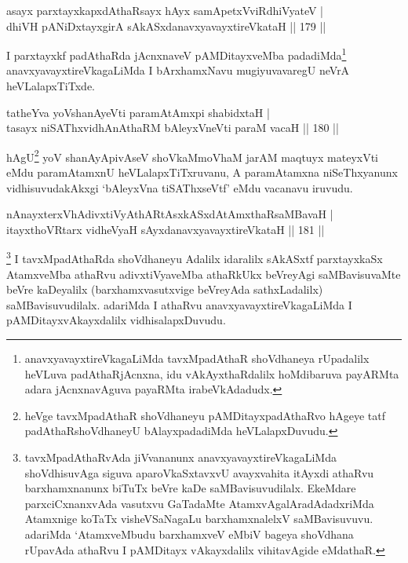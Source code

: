 
\begin{shl}
asayx parxtayxkapxdAthaRsayx hAyx samApetxVviRdhiVyateV |\\
dhiVH pANiDxtayxgirA sAkASxdanavxyavayxtireVkataH \hfill || 179 ||
\end{shl}

\begin{artha}
I parxtayxkf padAthaRda jAcnxnaveV pAMDitayxveMba padadiMda\footnote[1]{anavxyavayxtireVkagaLiMda tavxMpadAthaR shoVdhaneya rUpadalilx heVLuva padAthaRjAcnxna, idu vAkAyxthaRdalilx hoMdibaruva payARMta adara jAcnxnavAguva payaRMta irabeVkAdadudx.} anavxyavayxtireVkagaLiMda I bArxhamxNavu mugiyuvavaregU neVrA heVLalapxTiTxde.
\end{artha}


\begin{shl}
tatheYva yoV\s shanAyeVti paramAtAmx\s pi shabidxtaH |\\
tasayx niSAThxvidhAnAthaRM bAleyxVneVti paraM vacaH \hfill || 180 ||
\end{shl}

\begin{artha}
hAgU\footnote[2]{heVge tavxMpadAthaR shoVdhaneyu pAMDitayxpadAthaRvo hAgeye tatf padAthaRshoVdhaneyU bAlayxpadadiMda heVLalapxDuvudu.} yoV shanAyApivAseV shoVkaMmoVhaM jarAM maqtuyx mateyxVti eMdu paramAtamxnU heVLalapxTiTxruvanu, A paramAtamxna niSeThxyanunx vidhisuvudakAkxgi `bAleyxVna tiSAThxseVtf' eMdu vacanavu iruvudu.
\end{artha}

\begin{shl}
nAnayxterxVhAdivxtiVyAthARtAsxkASxdAtAmxthaRsaMBavaH |\\
itayxthoVR\s tarx vidheVyaH sAyxdanavxyavayxtireVkataH \hfill || 181 ||
\end{shl}

\begin{artha}%
\footnote[1]{tavxMpadAthaRvAda jiVvananunx anavxyavayxtireVkagaLiMda shoVdhisuvAga siguva aparoVkaSxtavxvU avayxvahita itAyxdi athaRvu barxhamxnanunx biTuTx beVre kaDe saMBavisuvudilalx. EkeMdare parxciCxnanxvAda vasutxvu GaTadaMte AtamxvAgalAradAdadxriMda Atamxnige koTaTx visheVSaNagaLu barxhamxnalelxV saMBavisuvuvu. adariMda `AtamxveMbudu barxhamxveV eMbiV bageya shoVdhana rUpavAda athaRvu I pAMDitayx vAkayxdalilx vihitavAgide eMdathaR.} I tavxMpadAthaRda shoVdhaneyu Adalilx idaralilx sAkASxtf parxtayxkaSx AtamxveMba athaRvu adivxtiVyaveMba athaRkUkx beVreyAgi saMBavisuvaMte beVre kaDeyalilx (barxhamxvasutxvige beVreyAda sathxLadalilx) saMBavisuvudilalx. adariMda I athaRvu anavxyavayxtireVkagaLiMda I pAMDitayxvAkayxdalilx vidhisalapxDuvudu.
\end{artha}

